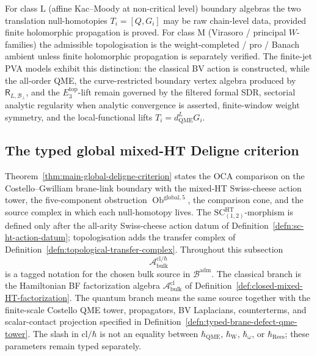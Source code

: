\begin{rmk}
\label{rmk:class-L-vs-class-M}
For class \(\mathrm L\) (affine Kac--Moody at non-critical level)
boundary algebras the two translation null-homotopies
\(T_i=[Q,G_i]\) may be raw chain-level data, provided finite
holomorphic propagation is proved.  For
class \(\mathrm M\) (Virasoro / principal \(W\)-families) the admissible
topologisation is the weight-completed / pro / Banach ambient unless
finite holomorphic propagation is separately verified.  The
finite-jet PVA models exhibit this distinction: the classical BV action
is constructed, while the all-order
QME, the curve-restricted boundary vertex algebra produced by
\(\mathsf R_{L,\mathcal B_\perp}\), and the \(E_3^{\mathrm{top}}\)-lift
remain governed by the filtered formal SDR, sectorial analytic
regularity when analytic convergence is asserted, finite-window weight
symmetry, and the local-functional lifts \(T_i=d_{\mathrm{QME}}^{L}G_i\).
\end{rmk}

\subsection{The typed global mixed-HT Deligne criterion}
\label{ssec:typed-global-mixed-ht-deligne}

Theorem~\ref{thm:main-global-deligne-criterion} states the OCA
comparison on the Costello--Gwilliam brane-link boundary with the
mixed-HT Swiss-cheese action tower, the five-component obstruction
\(\operatorname{Ob}^{\mathrm{global},5}\), the comparison cone, and the
source complex in which each null-homotopy lives.  The
\(\mathrm{SC}^{\mathrm{HT}}_{(1,2)}\)-morphism is defined only after the
all-arity Swiss-cheese action datum of
Definition~\ref{defn:sc-ht-action-datum}; topologisation adds the
transfer complex of Definition~\ref{defn:topological-transfer-complex}.
Throughout this subsection
\[
  \mathcal A^{\mathrm{cl}/\hbar}_{\mathrm{bulk}}
\]
is a tagged notation for the chosen bulk source in
\(\mathcal B^{\mathrm{adm}}\).  The classical branch is the Hamiltonian
BF factorization algebra \(\mathcal A^{\mathrm{cl}}_{\mathrm{bulk}}\) of
Definition~\ref{def:closed-mixed-HT-factorization}.  The quantum branch
means the same source together with the finite-scale Costello QME tower,
propagators, BV Laplacians, counterterms, and scalar-contact projection
specified in Definition~\ref{defn:typed-brane-defect-qme-tower}.  The
slash in \(\mathrm{cl}/\hbar\) is not an equality between
\(\hbar_{\mathrm{QME}}\), \(\hbar_{\mathrm{W}}\), \(\hbar_\omega\), or
\(\hbar_{\mathrm{Rees}}\); these parameters remain typed separately.

